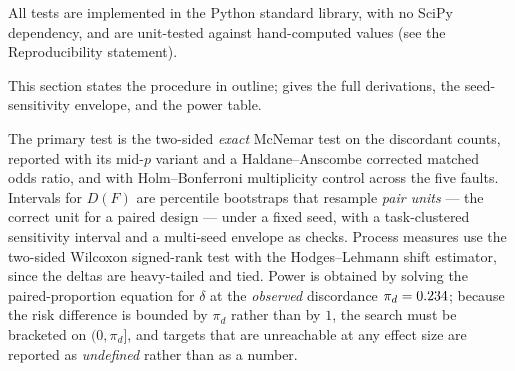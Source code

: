 All tests are implemented in the Python standard library, with no SciPy
dependency, and are unit-tested against hand-computed values (see the
Reproducibility statement).

This section states the procedure in outline;  gives the full
derivations, the seed-sensitivity envelope, and the power table.

The primary test is the two-sided \emph{exact} McNemar test on the discordant
counts, reported with its mid-$p$ variant and a Haldane--Anscombe corrected
matched odds ratio, and with Holm--Bonferroni multiplicity control across the five
faults. Intervals for $D(F)$ are percentile bootstraps that resample \emph{pair
units} --- the correct unit for a paired design --- under a fixed seed, with a
task-clustered sensitivity interval and a multi-seed envelope as checks. Process
measures use the two-sided Wilcoxon signed-rank test with the Hodges--Lehmann
shift estimator, since the deltas are heavy-tailed and tied. Power is obtained by
solving the paired-proportion equation for $\delta$ at the \emph{observed}
discordance $\pi_d = 0.234{}$; because the risk difference is bounded by
$\pi_d$ rather than by $1$, the search must be bracketed on $(0, \pi_d]$, and
targets that are unreachable at any effect size are reported as \emph{undefined}
rather than as a number.
